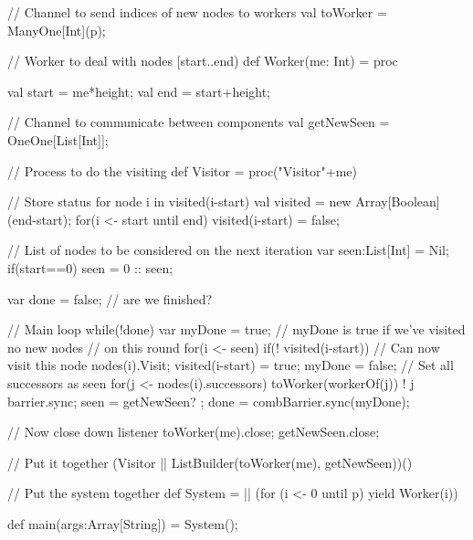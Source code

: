 \begin{answer}
\begin{enumerate}
\begin{scala}
{  // Channel to send indices of new nodes to workers
  val toWorker = ManyOne[Int](p);

  // Worker to deal with nodes [start..end)
  def Worker(me: Int) = proc{
    val start = me*height; val end = start+height;

    // Channel to communicate between components
    val getNewSeen = OneOne[List[Int]];

    // Process to do the visiting
    def Visitor = proc("Visitor"+me){
      // Store status for node i in visited(i-start)
      val visited = new Array[Boolean](end-start);
      for(i <- start until end) visited(i-start) = false;

      // List of nodes to be considered on the next iteration
      var seen:List[Int] = Nil;
      if(start==0) seen = 0 :: seen;

      var done = false; // are we finished?
      
      // Main loop
      while(!done){
	var myDone = true; 
        // myDone is true if we've visited no new nodes 
        // on this round
	for(i <- seen){
	  if(! visited(i-start)){
	    // Can now visit this node
	    nodes(i).Visit; visited(i-start) = true; 
            myDone = false;
	    // Set all successors as seen
	    for(j <- nodes(i).successors) 
              toWorker(workerOf(j)) ! j
	  }
	}
	barrier.sync;
	seen = getNewSeen? ;
	done = combBarrier.sync(myDone);
      }

      // Now close down listener
      toWorker(me).close; getNewSeen.close; 
    }

    // Put it together
    (Visitor || ListBuilder(toWorker(me), getNewSeen))()    
  }
	  
  // Put the system together
  def System = || (for (i <- 0 until p) yield Worker(i))

  def main(args:Array[String]) = System();
}
\end{scala}



\end{enumerate}
\end{answer}
